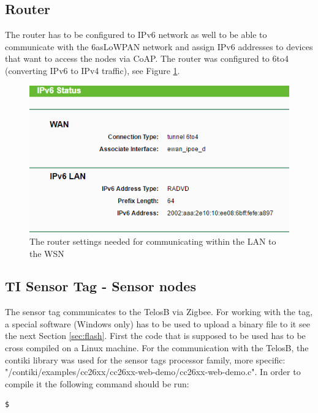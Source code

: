 \subsection{Router}

The router has to be configured to IPv6 network as well to be able to communicate with the 6asLoWPAN network and assign IPv6 addresses to devices that want to access the nodes via CoAP. The router was configured to 6to4 (converting IPv6 to IPv4 traffic), see Figure \ref{fig:routerSettings}.

\begin{figure}[!h]
	\centering
		\includegraphics[width=1\linewidth]{routerSettings}
		\caption{The router settings needed for communicating within the LAN to the WSN}
		\label{fig:routerSettings}
\end{figure} 

\subsection{TI Sensor Tag - Sensor nodes}

The sensor tag communicates to the TelosB via Zigbee. For working with the tag, a special software (Windows only) has to be used to upload a binary file to it see the next Section \ref{sec:flash}. First the code that is supposed to be used has to be cross compiled on a Linux machine. For the communication with the TelosB, the contiki library was used for the sensor tags processor family, more specific: "/contiki/examples/cc26xx/cc26xx-web-demo/cc26xx-web-demo.c". In order to compile it the following command should be run:

\begin{lstlisting}[language=bash,caption={Cross compiling the web-demo to a binary file for the sensor tag}]
$ 
\end{lstlisting}


